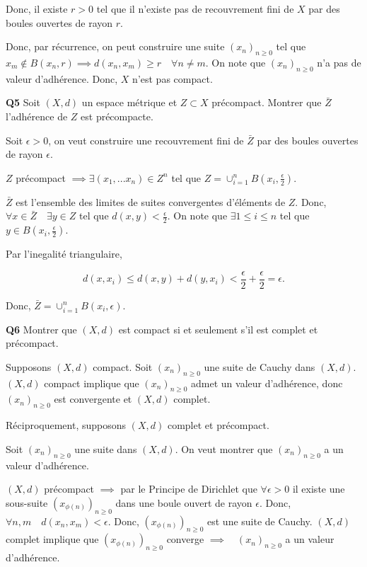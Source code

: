 \documentclass[french]{article}
\begin{document}
 	Donc, il existe $r>0$ tel que il n'existe pas de recouvrement fini de $X$ par des boules ouvertes de rayon $r$.
 	
 	Donc, par récurrence, on peut construire une suite $(x_n)_{n \geq 0}$ tel que $x_m \notin B(x_n, r) \implies d(x_n, x_m) \geq r \quad \forall n \neq m$. On note que $(x_n)_{n \geq 0}$ n'a pas de valeur d'adhérence. Donc, $X$ n'est pas compact.
 
 	\begin{tcolorbox}[colback=gray!5!white,colframe=gray!75!black]
 		\textbf{\large{Q5}} Soit $(X,d)$ un espace métrique et $Z \subset X$ précompact. Montrer que $\bar{Z}$ l'adhérence de $Z$ est précompacte.
 	\end{tcolorbox}
 
 	Soit $\epsilon > 0$, on veut construire une recouvrement fini de $\bar{Z}$ par des boules ouvertes de rayon $\epsilon$.
 	
 	$Z$ précompact $\implies \exists (x_1,...x_n) \in Z^n$ tel que $Z = \cup_{i=1}^{n} B(x_i, \frac{\epsilon}{2})$.
 	
 	$\bar{Z}$ est l'ensemble des limites de suites convergentes d'éléments de $Z$. Donc, $\forall x \in \bar{Z} \quad \exists y \in Z$ tel que $d(x, y) < \frac{\epsilon}{2}$. On note que $\exists 1 \leq i \leq n$ tel que $y \in B(x_i, \frac{\epsilon}{2})$.
 	
 	Par l'inegalité triangulaire,
 	
 	\[d(x, x_i) \leq d(x, y) + d(y, x_i) < \frac{\epsilon}{2} + \frac{\epsilon}{2} = \epsilon.\]
 	
 	Donc, $\bar{Z} = \cup_{i=1}^{n} B(x_i, \epsilon)$. 
 	
	\begin{tcolorbox}[colback=gray!5!white,colframe=gray!75!black]
		\textbf{\large{Q6}} Montrer que $(X,d)$ est compact si et seulement s'il est complet et précompact.
	\end{tcolorbox}

	Supposons $(X,d)$ compact. Soit $(x_n)_{n \geq 0}$ une suite de Cauchy dans $(X,d)$. $(X,d)$ compact implique que  $(x_n)_{n \geq 0}$ admet un valeur d'adhérence, donc $(x_n)_{n \geq 0}$ est convergente et $(X,d)$ complet.
	
	Réciproquement, supposons $(X,d)$ complet et précompact.
	
	Soit $(x_n)_{n \geq 0}$ une suite dans $(X,d)$. On veut montrer que $(x_n)_{n \geq 0}$ a un valeur d'adhérence.
	
	$(X,d)$ précompact $\implies$ par le Principe de Dirichlet que $\forall \epsilon > 0$ il existe une sous-suite $(x_{\phi(n)})_{n \geq 0}$ dans une boule ouvert de rayon $\epsilon$. Donc, $\forall n,m \quad d(x_n, x_m) < \epsilon$. Donc, $(x_{\phi(n)})_{n \geq 0}$ est une suite de Cauchy. $(X,d)$ complet implique que $(x_{\phi(n)})_{n \geq 0}$ converge $\implies \quad (x_n)_{n \geq 0}$ a un valeur d'adhérence.
\end{document}
